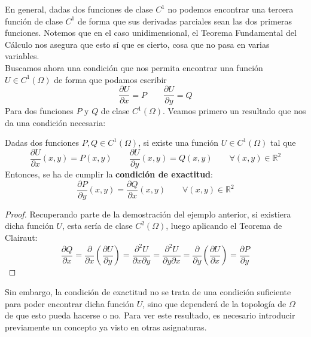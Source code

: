 En general, dadas dos funciones de clase $C^1$ no podemos encontrar una tercera función de clase $C^1$ de forma que sus derivadas parciales sean las dos primeras funciones. Notemos que en el caso unidimensional, el Teorema Fundamental del Cálculo nos asegura que esto sí que es cierto, cosa que no pasa en varias variables.\\

Buscamos ahora una condición que nos permita encontrar una función $U\in C^1(\Omega)$ de forma que podamos escribir
\begin{equation*}
    \dfrac{\partial U}{\partial x} = P \qquad \dfrac{\partial U}{\partial y} = Q 
\end{equation*}
Para dos funciones $P$ y $Q$ de clase $C^1(\Omega)$. Veamos primero un resultado que nos da una condición necesaria:

\begin{prop}\label{prop:condicion_necesaria}
    Dadas dos funciones $P,Q\in C^1(\Omega)$, si existe una función $U\in C^1(\Omega)$ tal que 
\begin{equation*}
    \dfrac{\partial U}{\partial x}(x,y) = P(x,y) \qquad \dfrac{\partial U}{\partial y}(x,y) = Q(x,y) \qquad \forall (x,y)\in \mathbb{R}^2
\end{equation*}
Entonces, se ha de cumplir la \textbf{condición de exactitud}:
    \begin{equation*}
        \dfrac{\partial P}{\partial y}(x,y) = \dfrac{\partial Q}{\partial x}(x,y) \qquad \forall (x,y)\in \mathbb{R}^2
    \end{equation*}
    \begin{proof}
        Recuperando parte de la demostración del ejemplo anterior, si existiera dicha función $U$, esta sería de clase $C^2(\Omega)$, luego aplicando el Teorema de Clairaut:
        \begin{equation*}
            \dfrac{\partial Q}{\partial x} = \dfrac{\partial }{\partial x}\left(\dfrac{\partial U}{\partial y}\right)= \dfrac{\partial^2 U}{\partial x\partial y} = \dfrac{\partial^2 U}{\partial y \partial x} = \dfrac{\partial}{\partial y}\left(\dfrac{\partial U}{\partial x}\right) = \dfrac{\partial P}{\partial y}
        \end{equation*}
    \end{proof}
\end{prop}

Sin embargo, la condición de exactitud no se trata de una condición suficiente para poder encontrar dicha función $U$, sino que dependerá de la topología de $\Omega$ de que esto pueda hacerse o no. Para ver este resultado, es necesario introducir previamente un concepto ya visto en otras asignaturas.

